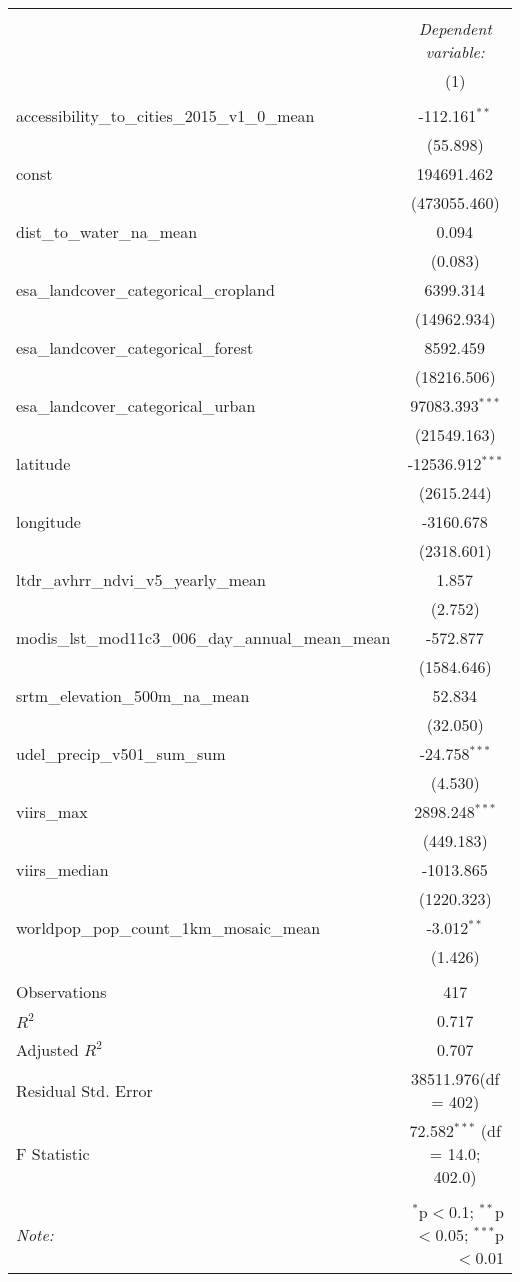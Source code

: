 \begin{table}[!htbp] \centering
\begin{tabular}{@{\extracolsep{5pt}}lc}
\\[-1.8ex]\hline
\hline \\[-1.8ex]
& \multicolumn{1}{c}{\textit{Dependent variable:}} \
\cr \cline{1-2}
\\[-1.8ex] & (1) \\
\hline \\[-1.8ex]
 accessibility_to_cities_2015_v1_0_mean & -112.161$^{**}$ \\
  & (55.898) \\
 const & 194691.462$^{}$ \\
  & (473055.460) \\
 dist_to_water_na_mean & 0.094$^{}$ \\
  & (0.083) \\
 esa_landcover_categorical_cropland & 6399.314$^{}$ \\
  & (14962.934) \\
 esa_landcover_categorical_forest & 8592.459$^{}$ \\
  & (18216.506) \\
 esa_landcover_categorical_urban & 97083.393$^{***}$ \\
  & (21549.163) \\
 latitude & -12536.912$^{***}$ \\
  & (2615.244) \\
 longitude & -3160.678$^{}$ \\
  & (2318.601) \\
 ltdr_avhrr_ndvi_v5_yearly_mean & 1.857$^{}$ \\
  & (2.752) \\
 modis_lst_mod11c3_006_day_annual_mean_mean & -572.877$^{}$ \\
  & (1584.646) \\
 srtm_elevation_500m_na_mean & 52.834$^{}$ \\
  & (32.050) \\
 udel_precip_v501_sum_sum & -24.758$^{***}$ \\
  & (4.530) \\
 viirs_max & 2898.248$^{***}$ \\
  & (449.183) \\
 viirs_median & -1013.865$^{}$ \\
  & (1220.323) \\
 worldpop_pop_count_1km_mosaic_mean & -3.012$^{**}$ \\
  & (1.426) \\
\hline \\[-1.8ex]
 Observations & 417 \\
 $R^2$ & 0.717 \\
 Adjusted $R^2$ & 0.707 \\
 Residual Std. Error & 38511.976(df = 402)  \\
 F Statistic & 72.582$^{***}$ (df = 14.0; 402.0) \\
\hline
\hline \\[-1.8ex]
\textit{Note:} & \multicolumn{1}{r}{$^{*}$p$<$0.1; $^{**}$p$<$0.05; $^{***}$p$<$0.01} \\
\end{tabular}
\end{table}